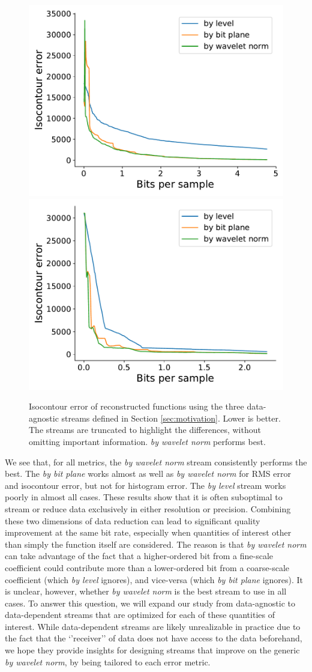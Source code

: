 \begin{figure}[h]
 	{\includegraphics[width=0.48\linewidth]{img/motivation/motivation-isocontour-plasma.pdf}}
 	{\includegraphics[width=0.48\linewidth]{img/motivation/motivation-isocontour-velocityz.pdf}}
 	\caption{Isocontour error of reconstructed functions using the three data-agnostic streams defined
 	in Section \ref{sec:motivation}. Lower is better. The streams are truncated to highlight the
 	differences, without omitting important information. \emph{by wavelet norm} performs best.}
 	\label{fig:motivation-isocontour}
\end{figure}

We see that, for all metrics, the \emph{by wavelet norm} stream consistently performs the
best. The \emph{by bit plane} works almost as well as \emph{by wavelet norm} for RMS error and
isocontour error, but not for histogram error. The \emph{by level} stream works poorly in almost all cases.
These results show that it is often suboptimal to stream or reduce data exclusively in either
resolution or precision. Combining these two dimensions of data reduction can lead to significant
quality improvement at the same bit rate, especially when quantities of interest other than simply
the function itself are considered. The reason is that \emph{by wavelet norm} can take advantage of
the fact that a higher-ordered bit from a fine-scale coefficient could contribute more than a
lower-ordered bit from a coarse-scale coefficient (which \emph{by level} ignores), and vice-versa
(which \emph{by bit plane} ignores). It is unclear, however, whether \emph{by wavelet norm} is the
best stream to use in all cases. To answer this question, we will expand our study from
data-agnostic to data-dependent streams that are optimized for each of these quantities of interest.
While data-dependent streams are likely unrealizable in practice due to the fact that the
`'receiver'' of data does not have access to the data beforehand, we hope they provide insights for
designing streams that improve on the generic \emph{by wavelet norm}, by being tailored to each
error metric.

